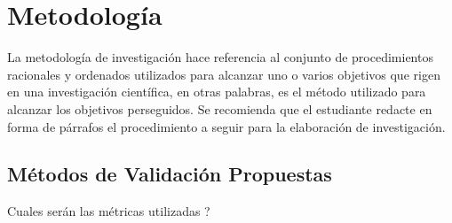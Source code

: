 \chapter{Metodología}
La metodología de investigación hace referencia al conjunto de procedimientos racionales y ordenados utilizados para alcanzar uno o varios objetivos que rigen en una investigación científica, en otras palabras, es el método utilizado para alcanzar los objetivos perseguidos. Se recomienda que el estudiante redacte en forma de párrafos el procedimiento a seguir para la elaboración de investigación.

\section{Métodos de Validación Propuestas}
Cuales serán las métricas utilizadas ?



